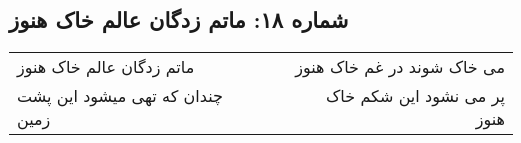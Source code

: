 \begin{center}
\section*{شماره ۱۸: ماتم زدگان عالم خاک هنوز}
\label{sec:018}
\begin{longtable}{l p{0.5cm} r}
ماتم زدگان عالم خاک هنوز
&&
می خاک شوند در غم خاک هنوز
\\
چندان که تهی میشود این پشت زمین
&&
پر می نشود این شکم خاک هنوز
\\
\end{longtable}
\end{center}
